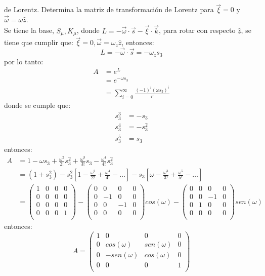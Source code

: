 \documentclass[12pt,letterpaper]{report}
\begin{document}
\begin{enumerate}
de Lorentz. Determina la matriz de transformación de Lorentz para $\vec{\xi}=0$ y $\vec{\omega}=\omega \hat{z}$.\\
Se tiene la base, $S_\mu , K_\mu$, donde $L=-\vec{\omega}\cdot \vec{s}- \vec{\xi}\cdot \vec{k}$, para rotar con respecto $\hat{z}$, se tiene que cumplir que:
$\vec{\xi}=0 , \vec{\omega}=\omega_z \hat{z}$, entonces:
\begin{equation*}
    L=-\vec{\omega}\cdot \vec{s}=-\omega_z s_3
\end{equation*}
por lo tanto:
\begin{align*}
    A&=e^L \\
    &=e^{-\omega s_3}\\
    &=\sum_{i=0}^\infty \frac{(-1)^i(\omega s_3)^i}{i!} 
\end{align*}
donde se cumple que: 
\begin{align*}
    s^3_3&=-s_3\\
s^4_3&=-s_3^2\\
s_3^5&=s_3
\end{align*}
entonces:
\begin{align*}
    A&=1-\omega s_3 + \frac{\omega^2}{2!}s_3^2 + \frac{\omega^3}{3!}s_3 - \frac{\omega^4}{4!}s_3^2\\
    &=(1+s_3^2)-s_3^2\left[1-\frac{\omega^2}{2!}+\frac{\omega^4}{4!}-\dots \right] - s_3 \left[\omega - \frac{\omega^3}{3!}+\frac{\omega^5}{5!}-\dots \right]\\
    &= \left(\begin{matrix}
        1 & 0 & 0 & 0 \\
        0 & 0 & 0 & 0 \\
        0 & 0 & 0 & 0 \\
        0 & 0 & 0 & 1 \\
    \end{matrix}\right) - \left(\begin{matrix}
        0 & 0 & 0 & 0 \\
        0 &-1 & 0 & 0 \\
        0 & 0 & -1 & 0 \\
        0 & 0 & 0 & 0 \\
    \end{matrix}\right) cos(\omega) - \left(\begin{matrix}
        0 & 0 & 0 & 0 \\
        0 & 0 & -1 & 0 \\
        0 & 1 & 0 & 0 \\
        0 & 0 & 0 & 0 \\
    \end{matrix}\right) sen(\omega)
\end{align*}
entonces:
\begin{equation*}
    A=\left(\begin{matrix}
        1 & 0 & 0 & 0 \\
        0 & cos(\omega) & sen(\omega) & 0 \\
        0 & -sen(\omega) & cos(\omega) & 0 \\
        0 & 0 & 0 & 1 \\
    \end{matrix}\right) 
\end{equation*}
\end{enumerate}
\end{document}
